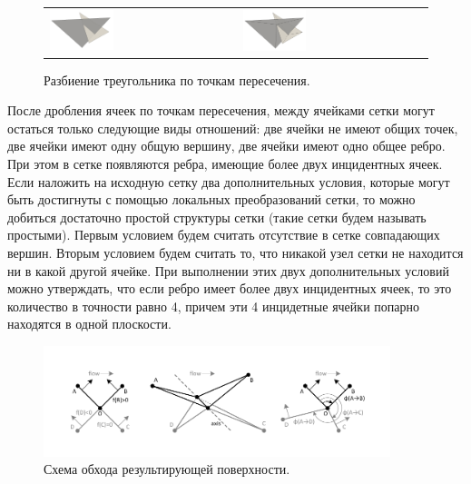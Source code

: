 \begin{figure}[ht]
\centering
\begin{tabular}{ll}
\includegraphics[width=0.35\textwidth]{./pics/text_1_int/pic_before_cut.png}
&
\includegraphics[width=0.35\textwidth]{./pics/text_1_int/pic_after_cut.png}
\end{tabular}
\singlespacing
{}\caption{Разбиение треугольника по точкам пересечения.}
\label{fig:text_1_int_tri_cut}
\end{figure}

После дробления ячеек по точкам пересечения, между ячейками сетки могут остаться только следующие виды отношений: две ячейки не имеют общих точек, две ячейки имеют одну общую вершину, две ячейки имеют одно общее ребро.
При этом в сетке появляются ребра, имеющие более двух инцидентных ячеек.
Если наложить на исходную сетку два дополнительных условия, которые могут быть достигнуты с помощью локальных преобразований сетки, то можно добиться достаточно простой структуры сетки (такие сетки будем называть простыми\label{term:mesh_simple}).
Первым условием будем считать отсутствие в сетке совпадающих вершин.
Вторым условием будем считать то, что никакой узел сетки не находится ни в какой другой ячейке.
При выполнении этих двух дополнительных условий можно утверждать, что если ребро имеет более двух инцидентных ячеек, то это количество в точности равно 4, причем эти 4 инцидетные ячейки попарно находятся в одной плоскости.

\begin{figure}[ht]
\centering
\includegraphics[width=0.9\textwidth]{pics/text_1_int/pic_walk_1.pdf}
\singlespacing
{}\caption{Схема обхода результирующей поверхности.}
\label{fig:text_1_int_walk}
\end{figure}


